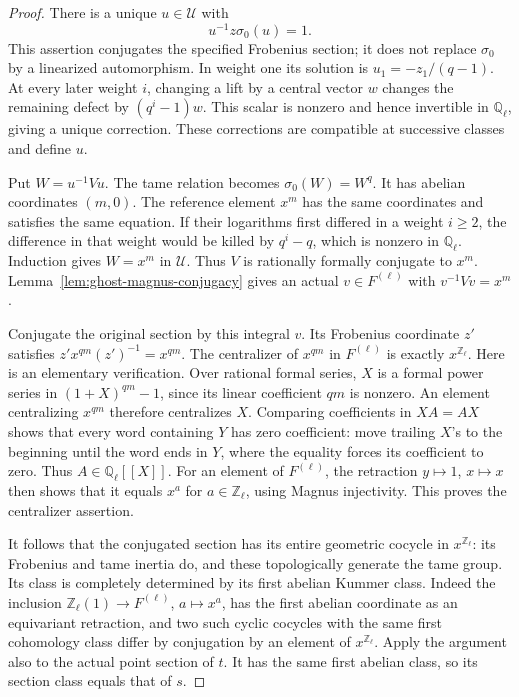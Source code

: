 \begin{proof}
There is a unique \(u\in\mathcal U\) with
\[
                 u^{-1}z\sigma_0(u)=1.
\]
This assertion conjugates the specified Frobenius
section; it does not replace \(\sigma_0\) by a
linearized automorphism. In weight one its solution
is \(u_1=-z_1/(q-1)\). At every later weight \(i\),
changing a lift by a central vector \(w\) changes
the remaining defect by \((q^i-1)w\). This scalar
is nonzero and hence invertible in \(\mathbb Q_\ell\),
giving a unique correction. These corrections are
compatible at successive classes and define \(u\).

Put \(W=u^{-1}Vu\). The tame relation becomes
\(\sigma_0(W)=W^q\). It has abelian coordinates
\((m,0)\). The reference element \(x^m\) has
the same coordinates and satisfies the same equation.
If their logarithms first differed in a weight
\(i\ge2\), the difference in that weight would
be killed by \(q^i-q\), which is nonzero in
\(\mathbb Q_\ell\). Induction gives
\(W=x^m\) in \(\mathcal U\). Thus \(V\) is
rationally formally conjugate to \(x^m\).
Lemma~\ref{lem:ghost-magnus-conjugacy} gives an actual
\(v\in F^{(\ell)}\) with \(v^{-1}Vv=x^m\).

Conjugate the original section by this integral
\(v\). Its Frobenius coordinate \(z'\) satisfies
\(z'x^{qm}(z')^{-1}=x^{qm}\). The centralizer of
\(x^{qm}\) in \(F^{(\ell)}\) is exactly
\(x^{\mathbb Z_\ell}\). Here is an elementary
verification. Over rational formal series, \(X\)
is a formal power series in \((1+X)^{qm}-1\),
since its linear coefficient \(qm\) is nonzero.
An element centralizing \(x^{qm}\) therefore
centralizes \(X\). Comparing coefficients in
\(XA=AX\) shows that every word containing \(Y\)
has zero coefficient: move trailing \(X\)'s to
the beginning until the word ends in \(Y\), where
the equality forces its coefficient to zero.
Thus \(A\in\mathbb Q_\ell[[X]]\). For an
element of \(F^{(\ell)}\), the retraction
\(y\mapsto1\), \(x\mapsto x\) then shows that
it equals \(x^a\) for \(a\in\mathbb Z_\ell\),
using Magnus injectivity. This proves the
centralizer assertion.

It follows that the conjugated section has its
entire geometric cocycle in \(x^{\mathbb Z_\ell}\):
its Frobenius and tame inertia do, and these
topologically generate the tame group. Its class
is completely determined by its first abelian
Kummer class. Indeed the inclusion
\(\mathbb Z_\ell(1)\to F^{(\ell)}\), \(a\mapsto x^a\),
has the first abelian coordinate as an equivariant
retraction, and two such cyclic cocycles with the
same first cohomology class differ by conjugation
by an element of \(x^{\mathbb Z_\ell}\).
Apply the argument also to the actual point section
of \(t\). It has the same first abelian class,
so its section class equals that of \(s\).


\end{proof}
